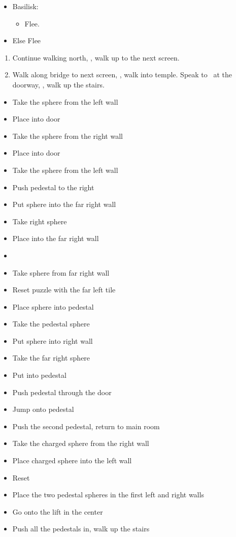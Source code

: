 \begin{encounters}
  \begin{itemize}
    \item Basilisk:
          \begin{itemize}
            \kimahrif Lancet Basilisk, learn \textbf{Stone Breath}
            \item Flee.
          \end{itemize}
    \item Else Flee
  \end{itemize}
\end{encounters}
\begin{enumerate}[resume]
  \item Continue walking north, \sd, walk up to the next screen.
  \item Walk along bridge to next screen, \sd, walk into temple. Speak to \auron\ at the doorway, \sd, walk up the stairs.
\end{enumerate}
\vfill
\begin{trial}
  \begin{itemize}
    \item Take the sphere from the left wall
    \item Place into door
    \item Take the sphere from the right wall
    \item Place into door
    \item Take the sphere from the left wall
    \item Push pedestal to the right
    \item Put sphere into the far right wall
    \item Take right sphere
    \item Place into the far right wall
    \item \cs
    \item Take sphere from far right wall
    \item Reset puzzle with the far left tile
    \item Place sphere into pedestal
    \item Take the pedestal sphere
    \item Put sphere into right wall
    \item Take the far right sphere
    \item Put into pedestal
    \item Push pedestal through the door
    \item Jump onto pedestal
    \item Push the second pedestal, return to main room
    \item Take the charged sphere from the right wall
    \item Place charged sphere into the left wall
    \item Reset
    \item Place the two pedestal spheres in the first left and right walls
    \item Go onto the lift in the center
    \item Push all the pedestals in, walk up the stairs
  \end{itemize}
\end{trial}
